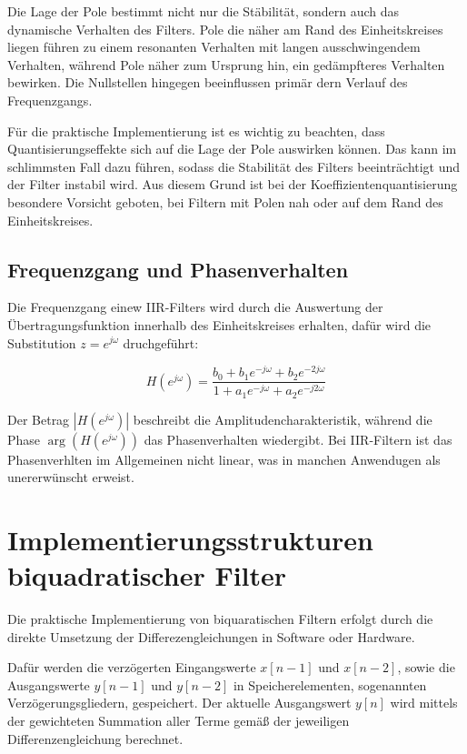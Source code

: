 \documentclass[
  ngerman,
  letterpaper,
  DIV=11]{scrreprt}
\begin{document}
Die Lage der Pole bestimmt nicht nur die Stäbilität, sondern auch das
dynamische Verhalten des Filters. Pole die näher am Rand des
Einheitskreises liegen führen zu einem resonanten Verhalten mit langen
ausschwingendem Verhalten, während Pole näher zum Ursprung hin, ein
gedämpfteres Verhalten bewirken. Die Nullstellen hingegen beeinflussen
primär dern Verlauf des Frequenzgangs.

Für die praktische Implementierung ist es wichtig zu beachten, dass
Quantisierungseffekte sich auf die Lage der Pole auswirken können. Das
kann im schlimmsten Fall dazu führen, sodass die Stabilität des Filters
beeinträchtigt und der Filter instabil wird. Aus diesem Grund ist bei
der Koeffizientenquantisierung besondere Vorsicht geboten, bei Filtern
mit Polen nah oder auf dem Rand des Einheitskreises.

\section{Frequenzgang und
Phasenverhalten}\label{frequenzgang-und-phasenverhalten}

Die Frequenzgang einew IIR-Filters wird durch die Auswertung der
Übertragungsfunktion innerhalb des Einheitskreises erhalten, dafür wird
die Substitution \(z = e^{j\omega}\) druchgeführt:

\[
H(e^{j\omega}) = \frac{b_0 + b_1 e^{-j\omega} + b_2 e^{-2j\omega}}{1 + a_1 e^{-j\omega} + a_2 e^{-j2\omega}}
\]

Der Betrag \(|H(e^{j\omega})|\) beschreibt die Amplitudencharakteristik,
während die Phase \(\arg(H(e^{j\omega}))\) das Phasenverhalten
wiedergibt. Bei IIR-Filtern ist das Phasenverhlten im Allgemeinen nicht
linear, was in manchen Anwendugen als unererwünscht erweist.

\chapter{Implementierungsstrukturen biquadratischer
Filter}\label{implementierungsstrukturen-biquadratischer-filter}

Die praktische Implementierung von biquaratischen Filtern erfolgt durch
die direkte Umsetzung der Differezengleichungen in Software oder
Hardware.

Dafür werden die verzögerten Eingangswerte \(x[n-1]\) und \(x[n-2]\),
sowie die Ausgangswerte \(y[n-1]\) und \(y[n-2]\) in Speicherelementen,
sogenannten Verzögerungsgliedern, gespeichert. Der aktuelle Ausgangswert
\(y[n]\) wird mittels der gewichteten Summation aller Terme gemäß der
jeweiligen Differenzengleichung berechnet.
\end{document}
